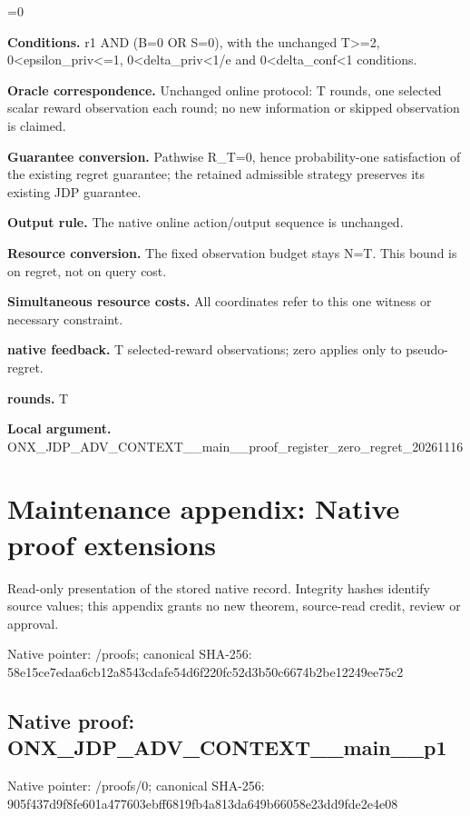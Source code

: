 \documentclass[10pt,a4paper]{article}
\newcommand{\AtlasMath}[1]{\par\begingroup\centering\setbox0=\hbox{$\displaystyle #1$}\ifdim\wd0>1.4\linewidth\typeout{ATLAS WIDE FORMULA: \the\wd0}\fi\ifdim\wd0>\linewidth\resizebox{\linewidth}{!}{\box0}\else\box0\fi\par\endgroup}
\begin{document}
\AtlasMath{0}
\textbf{Conditions.} r1 AND (B=0 OR S=0), with the unchanged T>=2, 0<epsilon\_\allowbreak{}priv<=1, 0<delta\_\allowbreak{}priv<1/e and 0<delta\_\allowbreak{}conf<1 conditions.

\textbf{Oracle correspondence.} Unchanged online protocol: T rounds, one selected scalar reward observation each round; no new information or skipped observation is claimed.

\textbf{Guarantee conversion.} Pathwise R\_\allowbreak{}T=0, hence probability-one satisfaction of the existing regret guarantee; the retained admissible strategy preserves its existing JDP guarantee.

\textbf{Output rule.} The native online action/output sequence is unchanged.

\textbf{Resource conversion.} The fixed observation budget stays N=T. This bound is on regret, not on query cost.

\textbf{Simultaneous resource costs.} All coordinates refer to this one witness or necessary constraint.

\textbf{native feedback.} T selected-reward observations; zero applies only to pseudo-regret.

\textbf{rounds.} T

\textbf{Local argument.} ONX\_\allowbreak{}JDP\_\allowbreak{}ADV\_\allowbreak{}CONTEXT\_\allowbreak{}\_\allowbreak{}main\_\allowbreak{}\_\allowbreak{}proof\_\allowbreak{}register\_\allowbreak{}zero\_\allowbreak{}regret\_\allowbreak{}20261116

\section{Maintenance appendix: Native proof extensions}
Read-only presentation of the stored native record. Integrity hashes identify source values; this appendix grants no new theorem, source-read credit, review or approval.

Native pointer: /proofs; canonical SHA-256: 58e15ce7edaa6cb12a8543cdafe54d6f220fc52d3b50c6674b2be12249ee75c2

\subsection{Native proof: ONX\_\allowbreak{}JDP\_\allowbreak{}ADV\_\allowbreak{}CONTEXT\_\allowbreak{}\_\allowbreak{}main\_\allowbreak{}\_\allowbreak{}p1}
Native pointer: /proofs/0; canonical SHA-256: 905f437d9f8fe601a477603ebff6819fb4a813da649b66058e23dd9fde2e4e08
\end{document}
